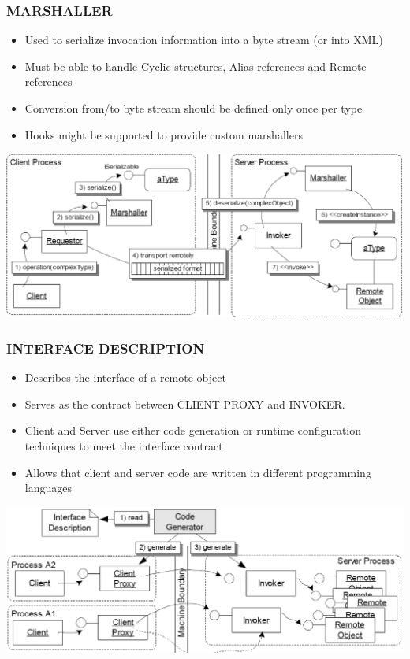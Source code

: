 \documentclass[10pt]{article}
\begin{document}
\subsubsection{MARSHALLER}
\begin{itemize}
	\item Used to serialize invocation information into a byte stream (or into XML)
	\item Must be able to handle Cyclic structures, Alias references and Remote references
	\item Conversion from/to byte stream should be defined only once per type
	\item Hooks might be supported to provide custom marshallers
\end{itemize}
\begin{center}
	\includegraphics[scale=0.2]{images/marshaller.png}
\end{center}
\subsubsection{INTERFACE DESCRIPTION}
\begin{itemize}
	\item Describes the interface of a remote object
	\item Serves as the contract between CLIENT PROXY and INVOKER.
	\item Client and Server use either code generation or runtime configuration techniques to meet the interface contract
	\item Allows that client and server code are written in different programming languages
\end{itemize}
\begin{center}
	\includegraphics[scale=0.2]{images/interface-description.png}
\end{center}
\end{document}
